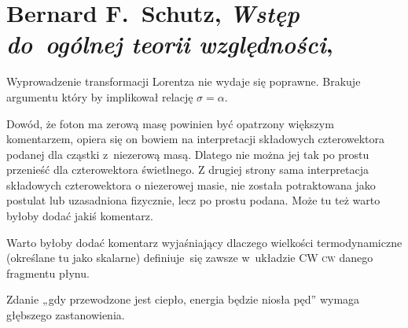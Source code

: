 \documentclass[a4paper,11pt]{article}
\numberwithin{equation}{section}
\begin{document}
\section{Bernard F.~Schutz,
  \textit{Wstęp do~ogólnej teorii względności},
  \cite{SchutzWstepDoOgolnejTeoriiWzglednosci2002}}

\vspace{0em}




\vspace{0em}


\noindent
{} Wyprowadzenie transformacji Lorentza nie wydaje się poprawne.
Brakuje argumentu który by implikował relację $\sigma = \alpha$.

\VerSpaceFour





\noindent
{} Dowód, że foton ma zerową masę powinien być opatrzony większym
komentarzem, opiera się on bowiem na interpretacji składowych czterowektora
podanej dla cząstki z~niezerową masą. Dlatego nie można jej tak po prostu
przenieść dla czterowektora świetlnego. Z drugiej strony sama interpretacja
składowych czterowektora o niezerowej masie, nie została potraktowana jako
postulat lub uzasadniona fizycznie, lecz po prostu podana. Może tu też warto
byłoby dodać jakiś komentarz.

\VerSpaceFour





\noindent
{} Warto byłoby dodać komentarz wyjaśniający dlaczego
wielkości termodynamiczne (określane tu jako skalarne) definiuje~się
zawsze w~układzie CW \textsc{cw} danego fragmentu płynu.

\VerSpaceFour





\noindent
{} Zdanie „gdy przewodzone jest ciepło, energia będzie niosła pęd”
wymaga głębszego zastanowienia.





\newpage

\end{document}
